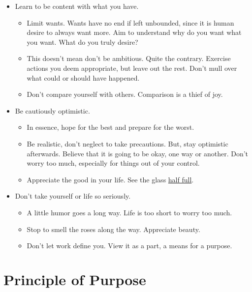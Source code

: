 \documentclass[
]{book}
\providecommand{\tightlist}{%
  \setlength{\itemsep}{0pt}\setlength{\parskip}{0pt}}
\begin{document}
\begin{itemize}
\tightlist
\item
  Learn to be content with what you have.

  \begin{itemize}
  \tightlist
  \item
    Limit wants. Wants have no end if left unbounded, since it is human desire to always want more. Aim to understand why do you want what you want. What do you truly desire?
  \item
    This doesn't mean don't be ambitious. Quite the contrary. Exercise actions you deem appropriate, but leave out the rest. Don't mull over what could or should have happened.
  \item
    Don't compare yourself with others. Comparison is a thief of joy.
  \end{itemize}
\item
  Be cautiously optimistic.

  \begin{itemize}
  \tightlist
  \item
    In essence, hope for the best and prepare for the worst.
  \item
    Be realistic, don't neglect to take precautions. But, stay optimistic afterwards. Believe that it is going to be okay, one way or another. Don't worry too much, especially for things out of your control.
  \item
    Appreciate the good in your life. See the glass \href{https://en.wikipedia.org/wiki/Is_the_glass_half_empty_or_half_full\%3F}{half full}.\\
  \end{itemize}
\item
  Don't take yourself or life so seriously.

  \begin{itemize}
  \tightlist
  \item
    A little humor goes a long way. Life is too short to worry too much.
  \item
    Stop to smell the roses along the way. Appreciate beauty.
  \item
    Don't let work define you. View it as a part, a means for a purpose.
  \end{itemize}
\end{itemize}

\hypertarget{principle-of-purpose}{%
\section{Principle of Purpose}\label{principle-of-purpose}}
\end{document}
